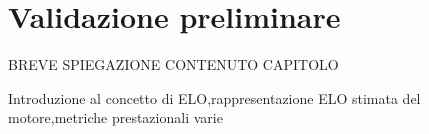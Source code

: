 \chapter{Validazione preliminare} %
%


\begin{citazione}
	BREVE SPIEGAZIONE CONTENUTO CAPITOLO
\end{citazione}

\newpage
Introduzione al concetto di ELO,rappresentazione ELO stimata del motore,metriche prestazionali
varie
